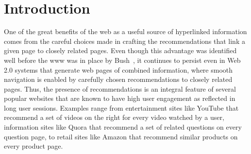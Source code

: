 \begin{abstract}

\iffalse
In this paper, we study the problem of graph recommendations as
variants of bipartite matching problems. We consider the problem
of solving such matching problems in practice at web-scale. To achieve
this we introduce several models to simulate underlying input graph
structures. We then analyze the conditions under which a random sample
of edges using constant memory already suffices to be a
'good' recommendation algorithm as opposed the cases when we may consider
the more classical and involved linear memory polynomial time algorithms.
We also show how to select the number of recommendations per item while
building a website so that there exists a 'perfect' graph recommendation.
\fi

\end{abstract}

\section{Introduction}

One of the great benefits of the web as a useful source of hyperlinked
information comes from the careful choices made in crafting the recommendations
that link a given page to closely related pages. Even though this advantage was
identified well before the www was in place by Bush~\cite{Bush45}, it continues
to persist even in Web 2.0 systems that generate web pages of combined
information, where smooth navigation is enabled by carefully chosen
recommendations to closely related pages. Thus, the presence of recommendations
is an integral feature of several popular websites that are known to have high
user engagement as reflected in long user sessions. Examples range from 
entertainment sites like YouTube that recommend a set of videos on the right
for every video watched by a user, information sites like Quora that recommend
a set of related questions on every question page, to retail sites like Amazon
that recommend similar products on every product page. \vs

